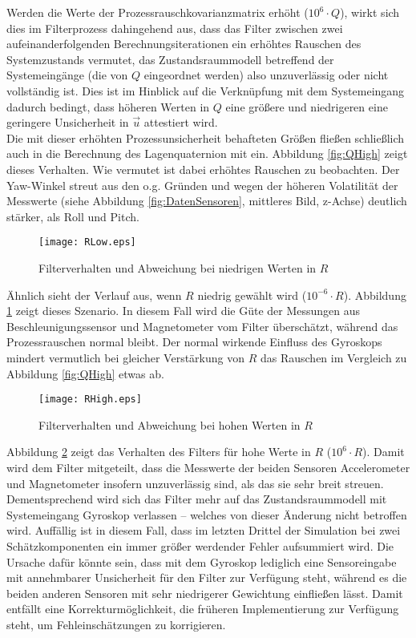 \documentclass[12pt,a4paper]{article}
\begin{document}
		Werden die Werte der Prozessrauschkovarianzmatrix erhöht ($10^{6}\cdot Q$), wirkt sich dies im Filterprozess dahingehend aus, dass das Filter zwischen zwei aufeinanderfolgenden Berechnungsiterationen ein erhöhtes Rauschen des Systemzustands vermutet, das Zustandsraummodell betreffend der Systemeingänge (die von $Q$ eingeordnet werden) also unzuverlässig oder nicht vollständig ist. Dies ist im Hinblick auf die Verknüpfung mit dem Systemeingang dadurch bedingt, dass höheren Werten in $Q$ eine größere und niedrigeren eine geringere Unsicherheit in $\vec{u}$ attestiert wird.\\
		Die mit dieser erhöhten Prozessunsicherheit behafteten Größen fließen schließlich auch in die Berechnung des Lagenquaternion mit ein. Abbildung \ref{fig:QHigh} zeigt dieses Verhalten. Wie vermutet ist dabei erhöhtes Rauschen zu beobachten. Der Yaw-Winkel streut aus den o.g. Gründen und wegen der höheren Volatilität der Messwerte (siehe Abbildung \ref{fig:DatenSensoren}, mittleres Bild, z-Achse) deutlich stärker, als Roll und Pitch.\\
		\begin{figure}[!ht]
			\hspace{-2cm}
			\texttt{[image: RLow.eps]}
			\caption{\label{fig:RLow}\centering Filterverhalten und Abweichung bei niedrigen Werten in $R$}
		\end{figure}
	
		Ähnlich sieht der Verlauf aus, wenn $R$ niedrig gewählt wird ($10^{-6}\cdot R$). Abbildung \ref{fig:RLow} zeigt dieses Szenario. In diesem Fall wird die Güte der Messungen aus Beschleunigungssensor und Magnetometer vom Filter überschätzt, während das Prozessrauschen normal bleibt. Der normal wirkende Einfluss des Gyroskops mindert vermutlich bei gleicher Verstärkung von $R$ das Rauschen im Vergleich zu Abbildung \ref{fig:QHigh} etwas ab.\\

		\begin{figure}[!ht]
			\hspace{-2cm}
			\texttt{[image: RHigh.eps]}
			\caption{\label{fig:RHigh}\centering Filterverhalten und Abweichung bei hohen Werten in $R$}
		\end{figure}
		Abbildung \ref{fig:RHigh} zeigt das Verhalten des Filters für hohe Werte in $R$ ($10^{6}\cdot R$). Damit wird dem Filter mitgeteilt, dass die Messwerte der beiden Sensoren Accelerometer und Magnetometer insofern unzuverlässig sind, als das sie sehr breit streuen. Dementsprechend wird sich das Filter mehr auf das Zustandsraummodell mit Systemeingang Gyroskop verlassen -- welches von dieser Änderung nicht betroffen wird. Auffällig ist in diesem Fall, dass im letzten Drittel der Simulation bei zwei Schätzkomponenten ein immer größer werdender Fehler aufsummiert wird. Die Ursache dafür könnte sein, dass mit dem Gyroskop lediglich eine Sensoreingabe mit annehmbarer Unsicherheit für den Filter zur Verfügung steht, während es die beiden anderen Sensoren mit sehr niedrigerer Gewichtung einfließen lässt. Damit entfällt eine Korrekturmöglichkeit, die früheren Implementierung zur Verfügung steht, um Fehleinschätzungen zu korrigieren.
\end{document}
